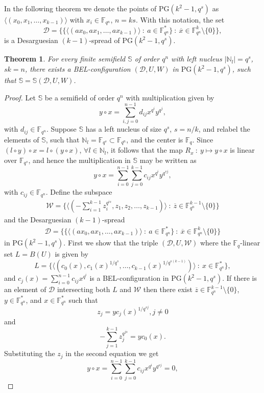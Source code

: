 \documentclass[12pt]{amsart}
\newtheorem{theorem}{\sc Theorem}[section]
\def\F{\mathbb{F}}
\def\PG{\mathrm{PG}}
\def\S{\mathbb{S}}
\def\W{\mathcal{W}}
\def\D{\mathcal{D}}
\def\N{\mathbb{N}}
\begin{document}
In the following theorem we denote the points of $\PG(k^2-1,q^s)$ as $\langle (x_0,x_1,\ldots, x_{k-1})\rangle$ with $x_i \in \F_{q^n}$, $n=ks$. With this notation, the set 
$$\D=\{\{\langle ( ax_0,ax_1,\ldots, a x_{k-1})\rangle ~:~ a \in \F_{q^n}^*\} ~:~\overline{x} \in\F_{q^n}^{k}\setminus \{0\}\},$$
is a Desarguesian $(k-1)$-spread of $\PG(k^2-1,q^s)$.
\begin{theorem}\label{thm:allsemifields}
For every finite semifield $\S$ of order $q^n$ with left nucleus $|\N_l|=q^{s}$, $sk=n$, there exists a BEL-configuration $(\D,U,W)$ in $\PG(k^2-1,q^s)$, such that $\S=\S(\D,U,W)$.
\end{theorem}
\begin{proof}
Let $\S$ be a semifield of order $q^n$ with multiplication given by 
$$
y\circ x = \sum_{i,j = 0}^{n-1}d_{ij}x^{q^i}y^{q^j},
$$
with $d_{ij} \in \F_{q^n}$. 
Suppose $\S$ has a left nucleus of size $q^s$, $s=n/k$, and relabel the elements of $\S$, such that $\N_l = \F_{q^s} \subset \F_{q^n}$, and the center is $\F_q$. Since $(l\circ y) \circ x = l \circ (y\circ x)$, $\forall l \in \N_l$, it follows that the map
$R_x~:~y\mapsto y\circ x$
is linear over $\F_{q^s}$, and hence the multiplication in $\S$ may be written as
$$
y\circ x =\sum_{i = 0}^{n-1} \sum_{j = 0}^{k-1}c_{ij}x^{q^i}y^{q^{sj}},
$$
with $c_{ij} \in \F_{q^n}$.
Define the subspace
\begin{eqnarray}\label{W}
\W=\{\langle ( -\sum_{i=1}^{k-1} z_i^{q^{is}},z_1,z_2,\ldots,z_{k-1})\rangle ~:~ \overline{z} \in \F_{q^n}^{k-1}\setminus\{0\}\}
\end{eqnarray}
and the Desarguesian $(k-1)$-spread
\begin{eqnarray}\label{D}
\D=\{\{\langle ( ax_0,ax_1,\ldots, a x_{k-1})\rangle ~:~ a \in \F_{q^n}^*\} ~:~\overline{x} \in\F_{q^n}^{k}\setminus \{0\}\}
\end{eqnarray}
in $\PG(k^2-1,q^s)$.
First we show that the triple $(\D,U,\W)$ where the $\F_q$-linear set $L=B(U)$ is given by
$$
L=\{\langle(c_0(x),c_1(x)^{1/q^s},\ldots,c_{k-1}(x)^{1/q^{s(k-1)}})\rangle ~:~x\in \F_{q^n}^*\},
$$
and $c_j(x)=\sum_{i=0}^{n-1}c_{ij} x^{q^i}$ is a BEL-configuration in $\PG(k^2-1,q^s)$. If there is an element of $\D$ intersecting both
$L$ and $\W$ then there exist $\overline{z} \in \F_{q^n}^{k-1}\setminus\{0\}$, $y \in \F_{q^n}^*$, and $x\in \F_{q^n}^*$ such that 
$$
z_j=yc_j(x)^{1/q^{sj}}, j\neq 0
$$
and
$$
- \sum_{j=1}^{k-1} z_j^{q^{js}}=yc_0(x).
$$
Substituting the $z_j$ in the second equation we get
$$
y\circ x=\sum_{i = 0}^{n-1} \sum_{j = 0}^{k-1}c_{ij}x^{q^i}y^{q^{sj}}=0,
$$
\end{proof}
\end{document}
